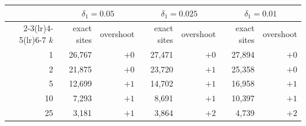\begin{tabular}{@{}rrrrrrr@{}}
\toprule
& \multicolumn{2}{c}{$\delta_1=0.05$} & \multicolumn{2}{c}{$\delta_1=0.025$} & \multicolumn{2}{c}{$\delta_1=0.01$} \\
\cmidrule(lr){2-3}\cmidrule(lr){4-5}\cmidrule(lr){6-7}
$k$ & exact sites & overshoot & exact sites & overshoot & exact sites & overshoot \\
\midrule
1 & 26,767 & $+0$ & 27,471 & $+0$ & 27,894 & $+0$ \\
2 & 21,875 & $+0$ & 23,720 & $+1$ & 25,358 & $+0$ \\
5 & 12,699 & $+1$ & 14,702 & $+1$ & 16,958 & $+1$ \\
10 & 7,293 & $+1$ & 8,691 & $+1$ & 10,397 & $+1$ \\
25 & 3,181 & $+1$ & 3,864 & $+2$ & 4,739 & $+2$ \\
\bottomrule
\end{tabular}
